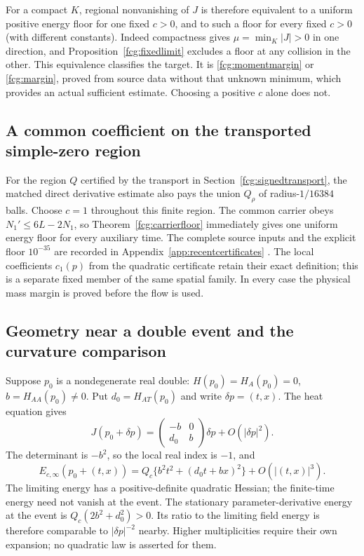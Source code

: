 \documentclass[11pt]{article}
\numberwithin{equation}{section}
\begin{document}
For a compact $K$, regional nonvanishing of $J$ is therefore equivalent
to a uniform positive energy floor for one fixed $c>0$, and to such
a floor for every fixed $c>0$ (with different constants).
Indeed compactness gives $\mu=\min_K|J|>0$ in one direction, and
Proposition~\ref{fcg:fixedlimit} excludes a floor at any collision
in the other. This equivalence classifies the target. It is
\eqref{fcg:momentmargin} or \eqref{fcg:margin}, proved from source
data without that unknown minimum, which provides an actual
sufficient estimate. Choosing a positive $c$ alone does not.

\subsection{A common coefficient on the transported simple-zero region}

For the region $Q$ certified by the transport in
Section~\ref{fcg:signedtransport}, the matched direct derivative
estimate also pays the union $Q_\rho$ of radius-$1/16384$ balls.
Choose $c=1$ throughout this finite region. The common carrier obeys
$N_1'\le6L-2N_1$, so Theorem~\ref{fcg:carrierfloor} immediately
gives one uniform energy floor for every auxiliary time.
The complete source inputs and the explicit floor $10^{-35}$ are
recorded in Appendix~\ref{app:recentcertificates}
\cite{FCGCommonFlowLimit}. The local coefficients $c_1(p)$ from the
quadratic certificate retain their exact definition; this is a
separate fixed member of the same spatial family. In every case the
physical mass margin is proved before the flow is used.

\subsection{Geometry near a double event and the curvature comparison}

Suppose $p_0$ is a nondegenerate real double:
$H(p_0)=H_A(p_0)=0$, $b=H_{AA}(p_0)\ne0$. Put
$d_0=H_{AT}(p_0)$ and write $\delta p=(t,x)$. The heat equation gives
\[
 J(p_0+\delta p)=
 \begin{pmatrix}-b&0\\d_0&b\end{pmatrix}\delta p+O(|\delta p|^2).
\]
The determinant is $-b^2$, so the local real index is $-1$, and
\begin{equation}\label{fcg:doubleenergy}
 E_{c,\infty}(p_0+(t,x))
 =Q_c\{b^2t^2+(d_0t+bx)^2\}+O(|(t,x)|^3).
\end{equation}
The limiting energy has a positive-definite quadratic Hessian;
the finite-time energy need not vanish at the event. The stationary
parameter-derivative energy at the event is $Q_c(2b^2+d_0^2)>0$.
Its ratio to the limiting field energy is therefore comparable to
$|\delta p|^{-2}$ nearby. Higher multiplicities require their own
expansion; no quadratic law is asserted for them.
\end{document}
